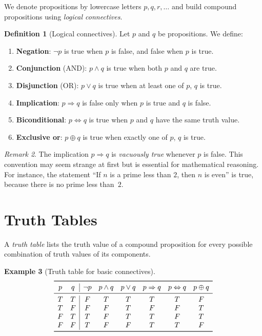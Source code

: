 \documentclass[12pt,a4paper,openany]{book}
\theoremstyle{definition}
\newtheorem{definition}{Definition}[chapter]
\newtheorem{example}[definition]{Example}
\theoremstyle{plain}
\theoremstyle{remark}
\newtheorem{remark}[definition]{Remark}
\begin{document}
We denote propositions by lowercase letters $p, q, r, \dots$ and build compound
propositions using \emph{logical connectives}.

\begin{definition}[Logical connectives]
\label{def:connectives}
Let $p$ and $q$ be propositions. We define:
\begin{enumerate}[nosep]
  \item \textbf{Negation}: $\lnot p$ is true when $p$ is false,
        and false when $p$ is true.
  \item \textbf{Conjunction} (AND): $p \land q$ is true when both
        $p$ and $q$ are true.
  \item \textbf{Disjunction} (OR): $p \lor q$ is true when at
        least one of $p$, $q$ is true.
  \item \textbf{Implication}: $p \Rightarrow q$ is false only when
        $p$ is true and $q$ is false.
  \item \textbf{Biconditional}: $p \Leftrightarrow q$ is true
        when $p$ and $q$ have the same truth value.
  \item \textbf{Exclusive or}: $p \oplus q$ is true when exactly
        one of $p$, $q$ is true.
\end{enumerate}
\end{definition}

\begin{remark}
\label{rem:implication-vacuous}
The implication $p \Rightarrow q$ is \emph{vacuously true} whenever
$p$ is false. This convention may seem strange at first but is essential for mathematical
reasoning. For instance, the statement ``If $n$ is a prime less than $2$, then $n$ is
even'' is true, because there is no prime less than~$2$.
\end{remark}

\section{Truth Tables}
\label{sec:truth-tables}

A \emph{truth table} lists the truth value of a compound proposition for every possible
combination of truth values of its components.

\begin{example}[Truth table for basic connectives]
\label{ex:truth-table-basic}
\[
\begin{array}{cc|cccccc}
\toprule
p & q & \lnot p & p \land q & p \lor q & p \Rightarrow q & p \Leftrightarrow q & p \oplus q \\
\midrule
T & T & F & T & T & T & T & F \\
T & F & F & F & T & F & F & T \\
F & T & T & F & T & T & F & T \\
F & F & T & F & F & T & T & F \\
\bottomrule
\end{array}
\]
\end{example}
\end{document}
